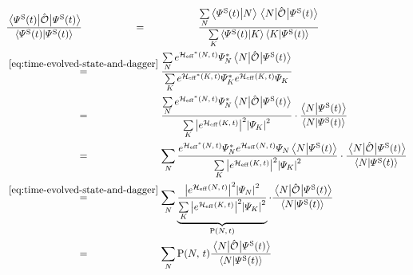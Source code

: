 \begin{equation}
    \label{eq:expectation-value}
    \begin{split}
        &\frac{\bracketHelper{\psiOfT[\schroedingerPicture]}{\ObservableOp}{\psiOfT[\schroedingerPicture]}}{\braketHelper{\psiOfT[\schroedingerPicture]}{\psiOfT[\schroedingerPicture]}}
        \stackrel{\phantom{\ref{eq:time-evolution-target}}}{=} 
        \frac{
            \lsum[N] \braketHelper{\psiOfT[\schroedingerPicture]}{N} \bracketHelper{N}{\ObservableOp}{\psiOfT[\schroedingerPicture]}
        }{
            \lsum[K] \braketHelper{\psiOfT[\schroedingerPicture]}{K} \braketHelper{K}{\psiOfT[\schroedingerPicture]}
        }\\
        &\stackrel{\ref{eq:time-evolved-state-and-dagger}}{=} 
        \frac{
            \lsum[N] e^{\HeffOftStar} \psiNStar \bracketHelper{N}{\ObservableOp}{\psiOfT[\schroedingerPicture]}
        }{
            \lsum[K] e^{\HeffOftStar[K]} \psiNStar[K] e^{\HeffOft[K]} \psiN[K] 
        }\\
        & \stackrel{\phantom{\ref{eq:time-evolved-state-and-dagger}}}{=} 
        \frac{
            \lsum[N] e^{\HeffOftStar} \psiNStar \bracketHelper{N}{\ObservableOp}{\psiOfT[\schroedingerPicture]}
        }{
            \lsum[K] \absSquare{e^{\HeffOft[K]}} \absSquare{\psiN[K]} 
        } \cdot 
        \frac{\braketHelper{N}{\psiOfT[\schroedingerPicture]}}{\braketHelper{N}{\psiOfT[\schroedingerPicture]}}\\
        & \stackrel{\phantom{\ref{eq:time-evolved-state-and-dagger}}}{=} 
        \lsum[N]
        \frac{
            e^{\HeffOftStar} \psiNStar e^{\HeffOft} \psiN{} \braketHelper{N}{\psiOfT[\schroedingerPicture]}
        }{
            \lsum[K] \absSquare{e^{\HeffOft[K]}} \absSquare{\psiN[K]} 
        }  \cdot 
        \frac{\bracketHelper{N}{\ObservableOp}{\psiOfT[\schroedingerPicture]}}{\braketHelper{N}{\psiOfT[\schroedingerPicture]}}\\
        & \stackrel{\ref{eq:time-evolved-state-and-dagger}}{=} 
        \lsum[N]
        \underbrace{\frac{
            \absSquare{e^{\HeffOft}} \absSquare{\psiN} 
        }{
            \lsum[K] \absSquare{e^{\HeffOft[K]}} \absSquare{\psiN[K]} 
        }}_{\probabilityOf{N}{t}} \cdot 
        \frac{\bracketHelper{N}{\ObservableOp}{\psiOfT[\schroedingerPicture]}}{\braketHelper{N}{\psiOfT[\schroedingerPicture]}}\\
        & \stackrel{\phantom{\ref{eq:time-evolved-state-and-dagger}}}{=} \lsum[N]
        \probabilityOf{N}{t}
        \frac{\bracketHelper{N}{\ObservableOp}{\psiOfT[\schroedingerPicture]}}{\braketHelper{N}{\psiOfT[\schroedingerPicture]}}

\end{split}
\end{equation}
